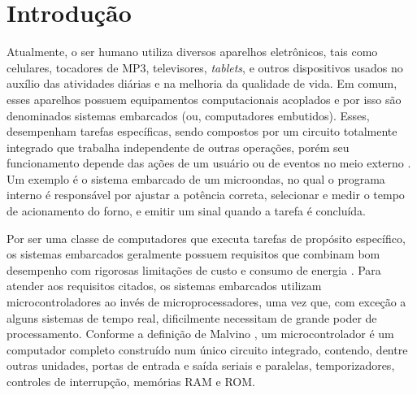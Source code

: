 
\chapter{Introdução} \label{Cap:Introducao}

Atualmente, o ser humano utiliza diversos aparelhos eletrônicos, tais como celulares, tocadores de MP3, televisores, \textit{tablets}, e outros dispositivos usados no auxílio das atividades diárias e na melhoria da qualidade de vida. Em comum, esses aparelhos possuem equipamentos computacionais acoplados e por isso são denominados sistemas embarcados (ou, computadores embutidos). Esses, desempenham tarefas específicas, sendo compostos por um circuito totalmente integrado que trabalha independente de outras operações, porém seu funcionamento depende das ações de um usuário ou de eventos no meio externo \cite{Cunha:2007}. Um exemplo é o sistema embarcado de um microondas, no qual o programa interno é responsável por ajustar a potência correta, selecionar e medir o tempo de acionamento do forno, e emitir um sinal quando a tarefa é concluída.

Por ser uma classe de computadores que executa tarefas de propósito específico, os sistemas embarcados geralmente possuem requisitos que combinam bom desempenho com rigorosas limitações de custo e consumo de energia \cite{Kruger:2014}. Para atender aos requisitos citados, os sistemas embarcados utilizam microcontroladores ao invés de microprocessadores, uma vez que, com exceção a alguns sistemas de tempo real, dificilmente necessitam de grande poder de processamento. Conforme a definição de Malvino \cite{Malvino:1985}, um microcontrolador é um computador completo construído num único circuito integrado, contendo, dentre outras unidades, portas de entrada e saída seriais e paralelas, temporizadores, controles de interrupção, memórias RAM e ROM. 

